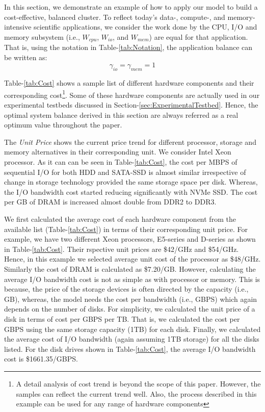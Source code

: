 \documentclass[journal]{IEEEtran}
\begin{document}
In this section, we demonstrate an example of how to apply our model to build a cost-effective, balanced cluster. To reflect today's data-, compute-, and memory-intensive scientific applications, we consider the work done by the CPU, I/O and memory subsystem (i.e., $W_{cpu}$, $W_{io}$, and $W_{mem}$) are equal for that application. That is, using the notation in Table-\ref{tab:Notation}, the application balance  can be written as:
\begin{equation} \label{eqn:PractAppBal}
\gamma_{io} = \gamma_{mem} = 1
\end{equation}

Table-\ref{tab:Cost} shows a sample list of different hardware components and their corresponding cost\footnote{A detail analysis of cost trend is beyond the scope of this paper. However, the samples can reflect the current trend well. Also, the process described in this example can be used for any range of hardware components}. Some of these hardware components are actually used in our experimental testbeds discussed in Section-\ref{sec:ExperimentalTestbed}. Hence, the optimal system balance derived in this section are always referred as a real optimum value throughout the paper. 

The \textit{Unit Price} shows the current price trend  for different processor, storage and memory alternatives in their corresponding unit. We consider Intel Xeon processor. As it can can be seen in  Table-\ref{tab:Cost}, the cost per MBPS of sequential I/O for both HDD and SATA-SSD is almost similar irrespective of change in storage technology provided the same storage space per disk. Whereas, the I/O bandwidth cost started reducing significantly with NVMe SSD. The cost per GB of DRAM is increased almost double from DDR2 to DDR3. 

We first calculated the average cost of each hardware component from the available list (Table-\ref{tab:Cost}) in terms of their corresponding unit price. For example, we have two different Xeon processors, E5-series and D-series as shown in Table-\ref{tab:Cost}. Their rspective unit prices are \$42/GHz and \$54/GHz. Hence, in this example we selected average unit cost of the processor as \$48/GHz. Similarly the cost of DRAM is calculated as \$7.20/GB. However, calculating the average I/O bandwidth cost is not as simple as with processor or memory. This is because, the price of the storage devices is often directed by the capacity (i.e., GB), whereas, the model needs the cost per bandwidth (i.e., GBPS) which again depends on the number of disks. For simplicity, we calculated the unit price of a disk in terms of cost per GBPS per TB. That is, we calculated the cost per GBPS using the same storage capacity (1TB) for each disk. Finally, we calculated the average cost of I/O bandwidth (again assuming 1TB storage) for all the disks listed. For the disk drives shown in Table-\ref{tab:Cost}, the average I/O bandwidth cost is \$1661.35/GBPS. 
\end{document}
